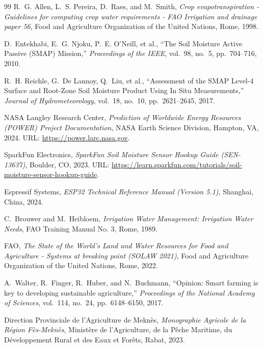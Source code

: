\documentclass[11pt,a4paper,oneside]{report}
\begin{document}
\begin{thebibliography}{99}
R.~G. Allen, L.~S. Pereira, D.~Raes, and M.~Smith, 
\emph{Crop evapotranspiration - Guidelines for computing crop water requirements - FAO Irrigation and drainage paper 56}, 
Food and Agriculture Organization of the United Nations, Rome, 1998.

D.~Entekhabi, E.~G. Njoku, P.~E. O'Neill, et al., 
``The Soil Moisture Active Passive (SMAP) Mission,'' 
\emph{Proceedings of the IEEE}, vol.~98, no.~5, pp.~704--716, 2010.

R.~H. Reichle, G.~De Lannoy, Q.~Liu, et al., 
``Assessment of the SMAP Level-4 Surface and Root-Zone Soil Moisture Product Using In Situ Measurements,'' 
\emph{Journal of Hydrometeorology}, vol.~18, no.~10, pp.~2621--2645, 2017.

NASA Langley Research Center, 
\emph{Prediction of Worldwide Energy Resources (POWER) Project Documentation}, 
NASA Earth Science Division, Hampton, VA, 2024. URL: \url{https://power.larc.nasa.gov}.

SparkFun Electronics, 
\emph{SparkFun Soil Moisture Sensor Hookup Guide (SEN-13637)}, 
Boulder, CO, 2023. URL: \url{https://learn.sparkfun.com/tutorials/soil-moisture-sensor-hookup-guide}.

Espressif Systems, 
\emph{ESP32 Technical Reference Manual (Version 5.1)}, 
Shanghai, China, 2024.

C.~Brouwer and M.~Heibloem, 
\emph{Irrigation Water Management: Irrigation Water Needs}, 
FAO Training Manual No. 3, Rome, 1989.

FAO, 
\emph{The State of the World's Land and Water Resources for Food and Agriculture - Systems at breaking point (SOLAW 2021)}, 
Food and Agriculture Organization of the United Nations, Rome, 2022.

A.~Walter, R.~Finger, R.~Huber, and N.~Buchmann, 
``Opinion: Smart farming is key to developing sustainable agriculture,'' 
\emph{Proceedings of the National Academy of Sciences}, vol.~114, no.~24, pp.~6148--6150, 2017.

Direction Provinciale de l'Agriculture de Meknès, 
\emph{Monographie Agricole de la Région Fès-Meknès}, 
Ministère de l'Agriculture, de la Pêche Maritime, du Développement Rural et des Eaux et Forêts, Rabat, 2023.
\end{thebibliography}
\end{document}
